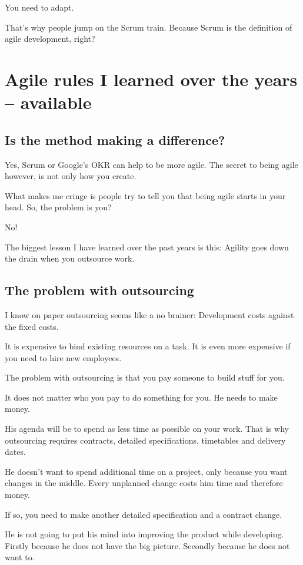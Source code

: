 \documentclass[12pt, numbers=noenddot]{scrreprt} %
\begin{document}
You need to adapt.

That’s why people jump on the Scrum train. Because Scrum is the definition of agile development, right?

\section{Agile rules I learned over the years -- available}

\subsection{Is the method making a difference?}
Yes, Scrum or Google’s OKR can help to be more agile. The secret to being agile however, is not only how you create.

What makes me cringe is people try to tell you that being agile starts in your head. So, the problem is you?

No!

The biggest lesson I have learned over the past years is this: Agility goes down the drain when you outsource work.

\subsection{The problem with outsourcing}
I know on paper outsourcing seems like a no brainer: Development costs against the fixed costs.

It is expensive to bind existing resources on a task. It is even more expensive if you need to hire new employees.

The problem with outsourcing is that you pay someone to build stuff for you.

It does not matter who you pay to do something for you. He needs to make money.

His agenda will be to spend as less time as possible on your work. That is why outsourcing requires contracts, detailed specifications, timetables and delivery dates.

He doesn’t want to spend additional time on a project, only because you want changes in the middle. Every unplanned change costs him time and therefore money.

If so, you need to make another detailed specification and a contract change.

He is not going to put his mind into improving the product while developing. Firstly because he does not have the big picture. Secondly because he does not want to.
\end{document}
